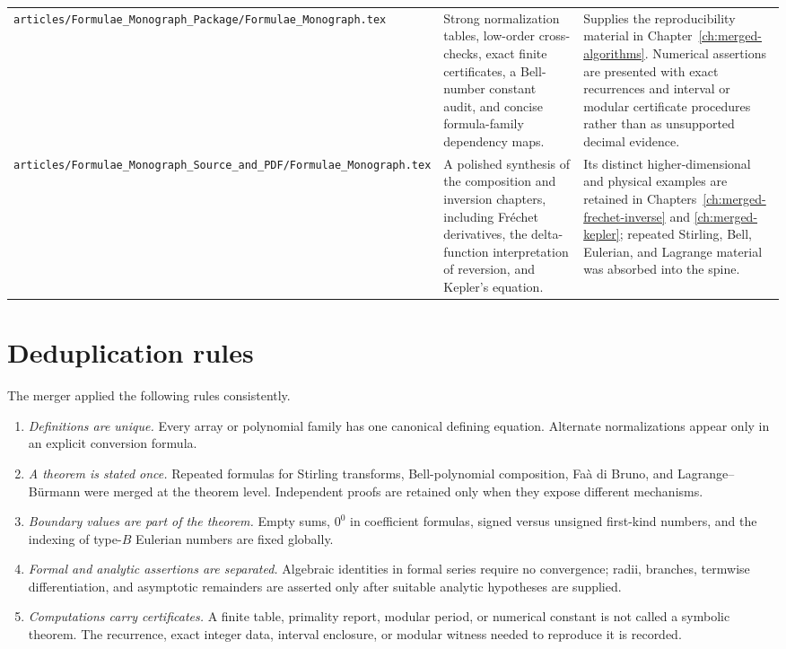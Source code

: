\documentclass[11pt,a4paper,oneside,openany]{book}
\theoremstyle{definition}
\theoremstyle{remark}
\begin{document}
\begin{longtable}{>{\raggedright\arraybackslash}p{}
                  >{\raggedright\arraybackslash}p{}
                  >{\raggedright\arraybackslash}p{}}
\nolinkurl{articles/Formulae_Monograph_Package/Formulae_Monograph.tex}
& Strong normalization tables, low-order cross-checks, exact finite certificates,
  a Bell-number constant audit, and concise formula-family dependency maps.
& Supplies the reproducibility material in Chapter~\ref{ch:merged-algorithms}.
  Numerical assertions are presented with exact recurrences and interval or
  modular certificate procedures rather than as unsupported decimal evidence.\\[1ex]

\nolinkurl{articles/Formulae_Monograph_Source_and_PDF/Formulae_Monograph.tex}
& A polished synthesis of the composition and inversion chapters, including
  Fr\'echet derivatives, the delta-function interpretation of reversion, and
  Kepler's equation.
& Its distinct higher-dimensional and physical examples are retained in
  Chapters~\ref{ch:merged-frechet-inverse} and \ref{ch:merged-kepler}; repeated
  Stirling, Bell, Eulerian, and Lagrange material was absorbed into the spine.\\
\end{longtable}
\renewcommand{\arraystretch}{1}

\section{Deduplication rules}

The merger applied the following rules consistently.
\begin{enumerate}
\item \emph{Definitions are unique.}  Every array or polynomial family has one
      canonical defining equation.  Alternate normalizations appear only in an
      explicit conversion formula.
\item \emph{A theorem is stated once.}  Repeated formulas for Stirling transforms,
      Bell-polynomial composition, Fa\`a di Bruno, and Lagrange--B\"urmann were
      merged at the theorem level.  Independent proofs are retained only when they
      expose different mechanisms.
\item \emph{Boundary values are part of the theorem.}  Empty sums, $0^0$ in
      coefficient formulas, signed versus unsigned first-kind numbers, and the
      indexing of type-$B$ Eulerian numbers are fixed globally.
\item \emph{Formal and analytic assertions are separated.}  Algebraic identities
      in formal series require no convergence; radii, branches, termwise
      differentiation, and asymptotic remainders are asserted only after suitable
      analytic hypotheses are supplied.
\item \emph{Computations carry certificates.}  A finite table, primality report,
      modular period, or numerical constant is not called a symbolic theorem.
      The recurrence, exact integer data, interval enclosure, or modular witness
      needed to reproduce it is recorded.
\end{enumerate}
\end{document}
